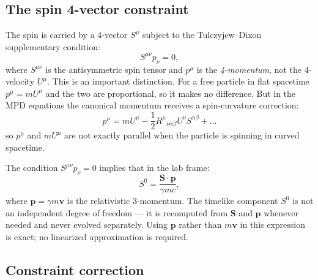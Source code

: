 \documentclass[11pt,a4paper]{article}
\newcommand{\vv}[1]{\mathbf{#1}}
\begin{document}
\subsection{The spin 4-vector constraint}

The spin is carried by a 4-vector $S^\mu$ subject to the Tulczyjew--Dixon supplementary condition:
\begin{equation}
\label{eq:td}
  S^{\mu\nu} p_\nu = 0,
\end{equation}
where $S^{\mu\nu}$ is the antisymmetric spin tensor and $p^\mu$ is the \emph{4-momentum}, not the 4-velocity $U^\mu$.  This is an important distinction.  For a free particle in flat spacetime $p^\mu = mU^\mu$ and the two are proportional, so it makes no difference.  But in the MPD equations the canonical momentum receives a spin-curvature correction:
\begin{equation}
  p^\mu = mU^\mu - \frac{1}{2}R^\mu{}_{\nu\alpha\beta}U^\nu S^{\alpha\beta} + \ldots
\end{equation}
so $p^\mu$ and $mU^\mu$ are not exactly parallel when the particle is spinning in curved spacetime.

The condition $S^{\mu\nu}p_\nu = 0$ implies that in the lab frame:
\begin{equation}
  S^0 = \frac{\vv{S}\cdot\vv{p}}{\gamma mc},
\end{equation}
where $\vv{p} = \gamma m\vv{v}$ is the relativistic 3-momentum.  The timelike component $S^0$ is not an independent degree of freedom --- it is recomputed from $\vv{S}$ and $\vv{p}$ whenever needed and never evolved separately.  Using $\vv{p}$ rather than $m\vv{v}$ in this expression is exact; no linearized approximation is required.

\subsection{Constraint correction}
\end{document}

